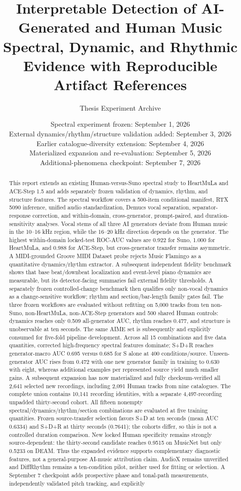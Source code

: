 \documentclass[11pt,a4paper]{article}
\title{Interpretable Detection of AI-Generated and Human Music\\
\large Spectral, Dynamic, and Rhythmic Evidence with Reproducible Artifact References}
\author{Thesis Experiment Archive}
\date{Spectral experiment frozen: September 1, 2026\\External dynamics/rhythm/structure validation added: September 3, 2026\\Earlier catalogue-diversity extension: September 4, 2026\\Materialized expansion and re-evaluation: September 5, 2026\\Additional-phenomena checkpoint: September 7, 2026}
\begin{document}
\maketitle

\begin{abstract}
This report extends an existing Human-versus-Suno spectral study to HeartMuLa and ACE-Step 1.5 and adds separately frozen validation of dynamics, rhythm, and structure features. The spectral workflow covers a 500-item conditional manifest, RTX 5090 inference, unified audio standardization, Demucs vocal separation, separator-response correction, and within-domain, cross-generator, prompt-paired, and duration-sensitivity analyses. Vocal stems of all three AI generators deviate from Human music in the 10--16 kHz region, while the 16--20 kHz direction depends on the generator. The highest within-domain locked-test ROC-AUC values are 0.922 for Suno, 1.000 for HeartMuLa, and 0.988 for ACE-Step, but cross-generator transfer remains asymmetric. A MIDI-grounded Groove MIDI Dataset probe rejects Music Flamingo as a quantitative dynamics/rhythm extractor. A subsequent independent fidelity benchmark shows that base beat/downbeat localization and event-level piano dynamics are measurable, but its detector-facing summaries fail external fidelity thresholds. A separately frozen controlled-change benchmark then qualifies only non-vocal dynamics as a change-sensitive workflow; rhythm and section/bar-length family gates fail. The three frozen workflows are evaluated without refitting on 5,000 tracks from ten non-Suno, non-HeartMuLa, non-ACE-Step generators and 500 shared Human controls: dynamics reaches only 0.509 all-generator AUC, rhythm reaches 0.477, and structure is unobservable at ten seconds. The same AIME set is subsequently and explicitly consumed for five-fold pipeline development. Across all 15 combinations and five data quantities, corrected high-frequency spectral features dominate; S+D+R reaches generator-macro AUC 0.695 versus 0.685 for S alone at 400 conditions/source. Unseen-generator AUC rises from 0.472 with one new generator family in training to 0.630 with eight, whereas additional examples per represented source yield much smaller gains. A subsequent expansion has now materialized and fully checksum-verified all 2,641 selected new recordings, including 2,091 Human tracks from nine catalogues. The complete union contains 10,141 recording identities, with a separate 4,497-recording unpadded thirty-second cohort. All fifteen nonempty spectral/dynamics/rhythm/section combinations are evaluated at five training quantities. Frozen source-transfer selection favors S+D at ten seconds (mean AUC 0.6334) and S+D+R at thirty seconds (0.7641); the cohorts differ, so this is not a controlled duration comparison. New locked Human specificity remains strongly source-dependent: the thirty-second candidate reaches 0.9515 on MusicNet but only 0.5233 on DEAM. Thus the expanded evidence supports complementary diagnostic features, not a general-purpose AI-music attribution claim. AudioX remains unverified and DiffRhythm remains a ten-condition pilot, neither used for fitting or selection. A September 7 checkpoint adds prospective phase and tonal-path measurements, independently validated pitch tracking, and explicitly 
\end{abstract}
\end{document}
